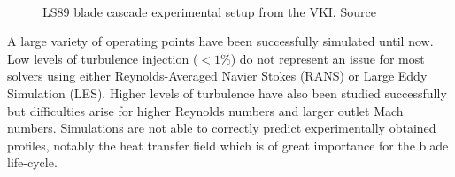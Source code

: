 \begin{figure}[!h]               
\centering
{}
 ~       
\qquad       
{}
\caption{LS89 blade cascade experimental setup from the VKI. Source~\cite{arts1990}}
\label{fig:vki-setup}
\end{figure}

A large variety of operating points have been successfully simulated until now. Low levels of turbulence injection ($<1$\%) do not represent an issue for most solvers \cite{Gourdain2010,emory2016} using either Reynolds-Averaged Navier Stokes (RANS) or Large Eddy Simulation (LES). Higher levels of turbulence have also been studied successfully~\cite{Wheeler2015} but difficulties arise for higher Reynolds numbers and larger outlet Mach numbers. Simulations are not able to correctly predict experimentally obtained profiles, notably the heat transfer field which is of great importance for the blade life-cycle.

